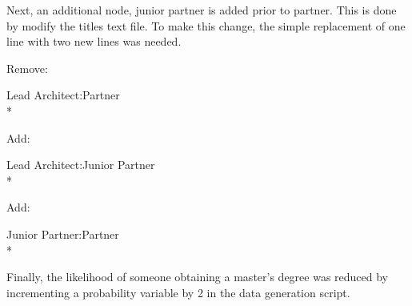\noindent Next, an additional node, junior partner is added prior to partner. 
This is done by modify the titles text file.  To make this change, the simple
replacement of one line with two new lines was needed.
	
	\begin{footnotesize}
	\indent Remove: \begin{tt}Lead Architect:Partner\\*\end{tt}
	\indent Add: \begin{tt}Lead Architect:Junior Partner\\*\end{tt}
	\indent Add: \begin{tt}Junior Partner:Partner\\*\end{tt}
	\end{footnotesize}
	
\noindent Finally, the likelihood of someone obtaining a master's degree was
reduced by incrementing a probability variable by 2 in the data generation
script.



\usetikzlibrary{shapes,arrows,chains}

